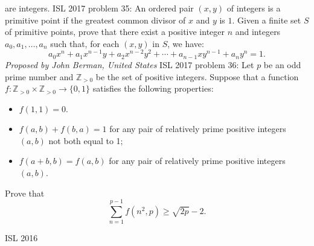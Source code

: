 are integers. 
ISL 2017 problem 35:  An ordered pair $(x, y)$ of integers is a primitive point if the greatest common divisor of $x$ and $y$ is $1$. Given a finite set $S$ of primitive points, prove that there exist a positive integer $n$ and integers $a_0, a_1, \ldots , a_n$ such that, for each $(x, y)$ in $S$, we have:
\[ a_0x^n + a_1x^{n-1} y + a_2x^{n-2}y^2 + \cdots + a_{n-1}xy^{n-1} + a_ny^n = 1. \]
\textit{Proposed by John Berman, United States} 
ISL 2017 problem 36:  Let $p$ be an odd prime number and $\mathbb{Z}_{>0}$ be the set of positive integers. Suppose that a function $f:\mathbb{Z}_{>0}\times\mathbb{Z}_{>0}\to\{0,1\}$ satisfies the following properties:
\begin{itemize}
  \item $f(1,1)=0$.
  \item $f(a,b)+f(b,a)=1$ for any pair of relatively prime positive integers $(a,b)$ not both equal to 1;
  \item $f(a+b,b)=f(a,b)$ for any pair of relatively prime positive integers $(a,b)$.
\end{itemize}
Prove that
\[ \sum_{n=1}^{p-1}f(n^2,p) \geqslant \sqrt{2p}-2. \] 

ISL 2016 

